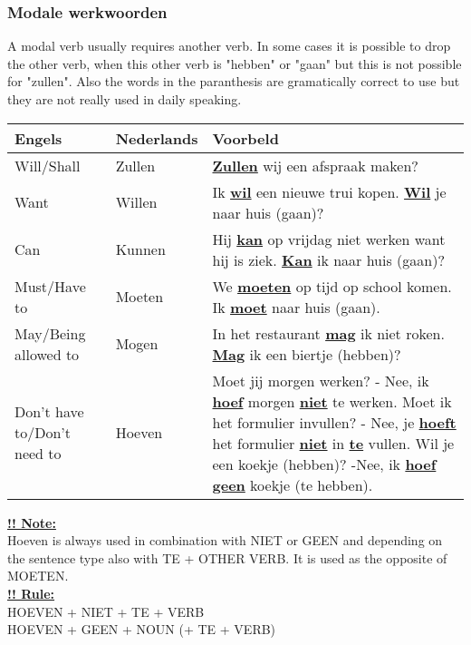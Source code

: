 \documentclass[a4paper,14pt]{extarticle}
\newcommand{\attention}[1]{\underline{\textbf{!! #1}}}
\newcommand{\emp}[1]{\underline{\textbf{#1}}}
\begin{document}
\subsubsection{Modale werkwoorden}
A modal verb usually requires another verb. In some cases it is possible to drop the other verb, when this other verb is "hebben" or "gaan" but this is not possible for "zullen". Also the words in the paranthesis are gramatically correct to use but they are not really used in daily speaking.
\begin{center}
\begin{tabularx}{\textwidth}{ l l p{250pt} }
 \hline
 Engels & Nederlands & Voorbeld \\
 \hline
 Will/Shall & Zullen & \emp{Zullen} wij een afspraak maken? \\
 Want & Willen & Ik \emp{wil} een nieuwe trui kopen. \newline \emp{Wil} je naar huis (gaan)? \\
 Can  & Kunnen & Hij \emp{kan} op vrijdag niet werken want hij is ziek. \newline \emp{Kan} ik naar huis (gaan)? \\
 Must/Have to & Moeten & We \emp{moeten} op tijd op school komen. \newline Ik \emp{moet} naar huis (gaan). \\
 May/Being allowed to & Mogen & In het restaurant \emp{mag} ik niet roken. \newline \emp{Mag} ik een biertje (hebben)? \\
 Don't have to/Don't need to & Hoeven & Moet jij morgen werken? \newline - Nee, ik \emp{hoef} morgen \emp{niet} te werken. \newline Moet ik het formulier invullen? \newline - Nee, je \emp{hoeft} het formulier \emp{niet} in \emp{te} vullen. \newline Wil je een koekje (hebben)? \newline -Nee, ik \emp{hoef geen} koekje (te hebben). \\
\end{tabularx}
\end{center}
\attention{Note:} \\
Hoeven is always used in combination with NIET or GEEN and depending on the sentence type also with TE + OTHER VERB. It is used as the opposite of MOETEN.
\\
\attention{Rule:} \\
HOEVEN + NIET + TE + VERB \\
HOEVEN + GEEN + NOUN (+ TE + VERB)
\end{document}
